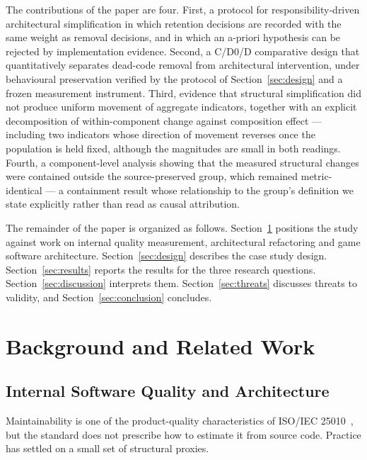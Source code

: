 \documentclass{sbc2019}%
\begin{document}
The contributions of the paper are four. First, a protocol for
responsibility-driven architectural simplification in which retention decisions
are recorded with the same weight as removal decisions, and in which an a-priori
hypothesis can be rejected by implementation evidence. Second, a C/D0/D
comparative design that quantitatively separates dead-code removal from
architectural intervention, under behavioural preservation verified by the
protocol of Section~\ref{sec:design} and a frozen measurement instrument. Third,
evidence that structural simplification did not produce uniform movement of
aggregate indicators, together with an explicit decomposition of within-component
change against composition effect --- including two indicators whose direction of
movement reverses once the population is held fixed, although the magnitudes are
small in both readings. Fourth, a component-level analysis showing that the
measured structural changes were contained outside the source-preserved group,
which remained metric-identical --- a containment result whose relationship to the
group's definition we state explicitly rather than read as causal attribution.

The remainder of the paper is organized as follows. Section~\ref{sec:related}
positions the study against work on internal quality measurement, architectural
refactoring and game software architecture. Section~\ref{sec:design} describes
the case study design. Section~\ref{sec:results} reports the results for the
three research questions. Section~\ref{sec:discussion} interprets them.
Section~\ref{sec:threats} discusses threats to validity, and
Section~\ref{sec:conclusion} concludes.


\section{Background and Related Work}\label{sec:related}

\subsection{Internal Software Quality and Architecture}

Maintainability is one of the product-quality characteristics of ISO/IEC
25010~\cite{iso25010}, but the standard does not prescribe how to estimate it from
source code. Practice has settled on a small set of structural proxies.
\end{document}
